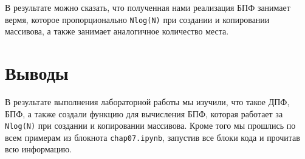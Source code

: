 \documentclass[a4paper]{article}
\begin{document}
            В результате можно сказать, что полученная нами реализация БПФ занимает вермя, которое пропорционально \texttt{Nlog(N)} при создании и копировании массивова, а также занимает аналогичное количество места.
            
    \newpage
        \section{Выводы}
             В результате выполнения лабораторной работы мы изучили, что такое ДПФ, БПФ, а также создали функцию для вычисления БПФ, которая работает за \texttt{Nlog(N)} при создании и копировании массивова. Кроме того мы прошлись по всем примерам из блокнота \texttt{chap07.ipynb}, запустив все блоки кода и прочитав всю информацию.
            
\end{document}
